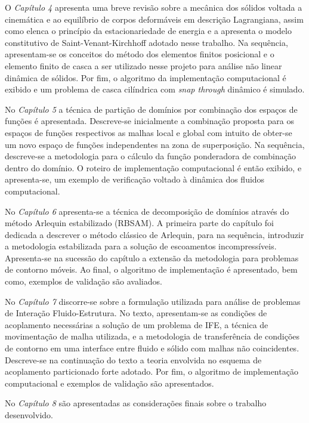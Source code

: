O \textit{Capítulo 4} apresenta uma breve revisão sobre a mecânica dos sólidos voltada a cinemática e ao equilíbrio de corpos deformáveis em descrição Lagrangiana, assim como elenca o princípio da estacionariedade de energia e a apresenta o modelo constitutivo de Saint-Venant-Kirchhoff adotado nesse trabalho. Na sequência, apresentam-se os conceitos do método dos elementos finitos posicional e o elemento finito de casca a ser utilizado nesse projeto para análise não linear dinâmica de sólidos. Por fim, o algoritmo da implementação computacional é exibido e um problema de casca cilíndrica com \textit{snap through} dinâmico é simulado.

No \textit{Capítulo 5} a técnica de partição de domínios por combinação dos espaços de funções é apresentada.  Descreve-se inicialmente a combinação proposta para os espaços de funções respectivos as malhas local e global com intuito de obter-se um novo espaço de funções independentes na zona de superposição. Na sequência, descreve-se a metodologia para o cálculo da função ponderadora de combinação dentro do domínio. O roteiro de implementação computacional é então exibido, e apresenta-se, um exemplo de verificação voltado à dinâmica dos fluidos computacional.

No \textit{Capítulo 6} apresenta-se a técnica de decomposição de domínios através do método Arlequin estabilizado (RBSAM). A primeira parte do capítulo foi dedicada a descrever o método clássico de Arlequin, para na sequência, introduzir a metodologia estabilizada para a solução de escoamentos incompressíveis. Apresenta-se na sucessão do capítulo a extensão da metodologia para problemas de contorno móveis. Ao final, o algoritmo de implementação é apresentado, bem como, exemplos de validação são avaliados.

No \textit{Capítulo 7} discorre-se sobre a formulação utilizada para análise de problemas de Interação Fluido-Estrutura. No texto, apresentam-se as condições de acoplamento necessárias a solução de um problema de IFE, a técnica de movimentação de malha utilizada, e a metodologia de transferência de condições de contorno em uma interface entre fluido e sólido com malhas não coincidentes. Descreve-se na continuação do texto a teoria envolvida no esquema de acoplamento particionado forte adotado. Por fim, o algoritmo de implementação computacional e exemplos de validação são apresentados.

No \textit{Capítulo 8} são apresentadas as considerações finais sobre o trabalho desenvolvido. 

